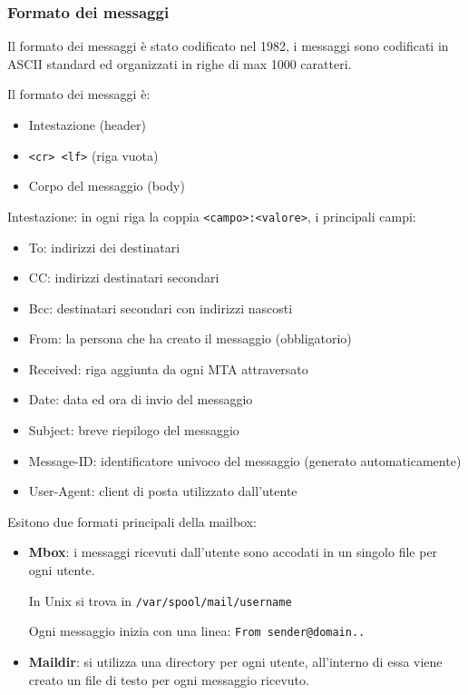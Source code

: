         \subsubsection{Formato dei messaggi}
            Il formato dei messaggi è stato codificato nel 1982, i messaggi sono codificati in ASCII standard ed organizzati in righe di max 1000 caratteri.
        
            Il formato dei messaggi è:
            \begin{itemize}
                \item Intestazione (header)
                \item \verb:<cr> <lf>: (riga vuota)
                \item Corpo del messaggio (body)
            \end{itemize}
            
            Intestazione: in ogni riga la coppia \verb-<campo>:<valore>-, i principali campi:
            \begin{itemize}
                \item To: indirizzi dei destinatari
                \item CC: indirizzi destinatari secondari
                \item Bcc: destinatari secondari con indirizzi nascosti
                \item From: la persona che ha creato il messaggio (obbligatorio)
                \item Received: riga aggiunta da ogni MTA attraversato
                \item Date: data ed ora di invio del messaggio
                \item Subject: breve riepilogo del messaggio
                \item Message-ID: identificatore univoco del messaggio (generato automaticamente)
                \item User-Agent: client di posta utilizzato dall'utente
            \end{itemize}

            Esitono due formati principali della mailbox:
            \begin{itemize}
                \item \textbf{Mbox}: i messaggi ricevuti dall'utente sono accodati in un singolo file per ogni utente.
                
                In Unix si trova in \verb:/var/spool/mail/username:

                Ogni messaggio inizia con una linea: \verb:From sender@domain..:
                \item \textbf{Maildir}: si utilizza una directory per ogni utente, all'interno di essa viene creato un file di testo per ogni messaggio ricevuto.
            \end{itemize}

